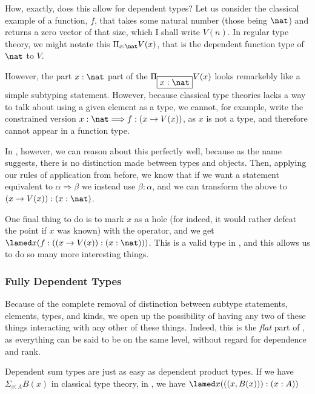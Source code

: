 How, exactly, does this allow for dependent types?
Let us consider the classical example of a function, $f$, that takes some natural number (those being $\nat$) and returns a zero vector of that size, which I shall write $V(n)$. 
In regular type theory, we might notate this $\Pi_{x:\nat} V(x)$, that is the dependent function type of $\nat$ to $V$.

However, the part $x : \nat$ part of the $\Pi_{\fbox{$x:\nat$}}V(x)$ looks remarkebly like a simple subtyping statement.
However, because classical type theories lacks a way to talk about using a given element as a type, we cannot, for example, write the constrained version $x:\nat \Longrightarrow f : (x \to V(x))$, as $x$ is not a type, and therefore cannot appear in a function type.

In \this, however, we can reason about this perfectly well, because as the name suggests, there is no distinction made between types and objects. 
Then, applying our rules of application from before, we know that if we want a statement equivalent to $\alpha \Rightarrow \beta$ we instead use $\beta : \alpha$, and we can transform the above to $(x \to V(x)) : (x : \nat)$.

One final thing to do is to mark $x$ as a hole (for indeed, it would rather defeat the point if $x$ was known) with the \lamed operator, and we get $\lamed x(f : ((x \to V(x)) : (x : \nat)))$.
This is a valid type in \this, and this allows us to do so many more interesting things.

\subsubsection{Fully Dependent Types}

Because of the complete removal of distinction between subtype statements, elements, types, and kinds, we open up the possibility of having any two of these things interacting with any other of these things.
Indeed, this is the \emph{flat} part of \this, as everything can be said to be on the same level, without regard for dependence and rank.

Dependent sum types are just as easy as dependent product types.
If we have $\Sigma_{x:A} B(x)$ in classical type theory, in \this, we have $\lamed x (((x,B(x))) : (x : A))$
